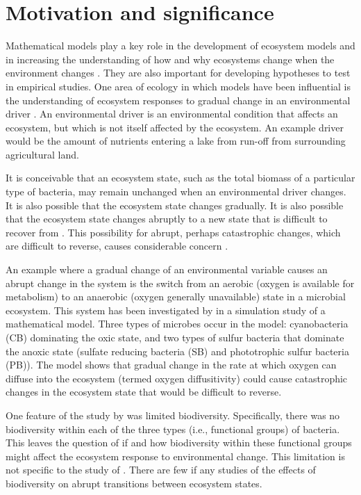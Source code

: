\documentclass[]{elsarticle} %
\begin{document}
\hypertarget{motivation-and-significance}{%
\section{Motivation and significance}\label{motivation-and-significance}}

Mathematical models play a key role in the development of ecosystem models and in increasing the understanding of how and why ecosystems change when the environment changes \citep{Binzer2016a, Chaparro-Pedraza2021, Vasseur2005}. They are also important for developing hypotheses to test in empirical studies. One area of ecology in which models have been influential is the understanding of ecosystem responses to gradual change in an environmental driver \citep{Scheffer2001}. An environmental driver is an environmental condition that affects an ecosystem, but which is not itself affected by the ecosystem. An example driver would be the amount of nutrients entering a lake from run-off from surrounding agricultural land.

It is conceivable that an ecosystem state, such as the total biomass of a particular type of bacteria, may remain unchanged when an environmental driver changes. It is also possible that the ecosystem state changes gradually. It is also possible that the ecosystem state changes abruptly to a new state that is difficult to recover from \citep{Scheffer2001}. This possibility for abrupt, perhaps catastrophic changes, which are difficult to reverse, causes considerable concern \citep{Collins2021, Northrop2021, Vandermeer2019}.

An example where a gradual change of an environmental variable causes an abrupt change in the system is the switch from an aerobic (oxygen is available for metabolism) to an anaerobic (oxygen generally unavailable) state in a microbial ecosystem. This system has been investigated by \citet{Bush2017} in a simulation study of a mathematical model. Three types of microbes occur in the model: cyanobacteria (CB) dominating the oxic state, and two types of sulfur bacteria that dominate the anoxic state (sulfate reducing bacteria (SB) and phototrophic sulfur bacteria (PB)). The model shows that gradual change in the rate at which oxygen can diffuse into the ecosystem (termed oxygen diffusitivity) could cause catastrophic changes in the ecosystem state that would be difficult to reverse.

One feature of the study by \citet{Bush2017} was limited biodiversity. Specifically, there was no biodiversity within each of the three types (i.e., functional groups) of bacteria. This leaves the question of if and how biodiversity within these functional groups might affect the ecosystem response to environmental change. This limitation is not specific to the study of \citet{Bush2017}. There are few if any studies of the effects of biodiversity on abrupt transitions between ecosystem states.
\end{document}
